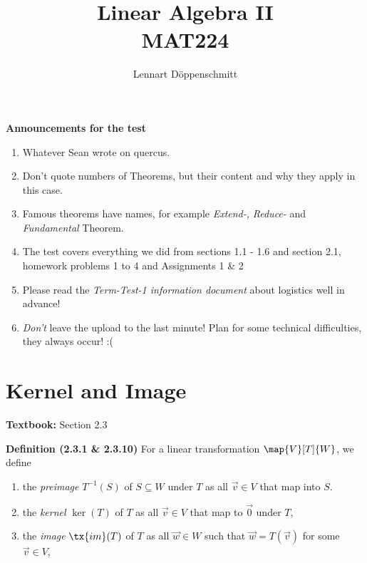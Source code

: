 \documentclass[letterpaper, 10pt]{article}
\begin{document}

\title{Linear Algebra II \\ \Large{MAT224}}
\author{Lennart Döppenschmitt}



\lb
\textbf{Announcements for the test} 
\begin{enumerate}
    \item Whatever Sean wrote on quercus.
    \item Don't quote numbers of Theorems, but their content and why they apply in this case.
    \item Famous theorems have names, for example \emph{Extend-,} \emph{Reduce-} and \emph{Fundamental} Theorem.

    \item The test covers everything we did from sections 1.1 - 1.6 and section 2.1,
        homework problems 1 to 4 and Assignments 1 \& 2

    \item Please read the \emph{Term-Test-1 information document} about logistics
        well in advance!
    \item \emph{Don't} leave the upload to the last minute!
        Plan for some technical difficulties, they always occur! :(
\end{enumerate}

\section*{Kernel and Image}%

\textbf{Textbook:} Section 2.3














\lb
\textbf{Definition (2.3.1 \& 2.3.10)}
\lb
For a linear transformation $ \map{V}[T]{W}$, we define
\begin{enumerate}
    \item
        the \emph{preimage} $T^{-1}(S)$ of $S \subseteq W$ under $T$ as all $\vec v ∈ V$ that map into $S$.
    \item
        the \emph{kernel} $\ker(T)$ of $T$  as all $\vec v ∈ V$ that map to $\vec 0$ under $T$,
    \item 
        the \emph{image} $\tx{im}(T)$ of $T$ as all $\vec w ∈ W$ such that $\vec w = T(\vec v)$ for some $\vec v ∈ V$,
\end{enumerate}
\end{document}
